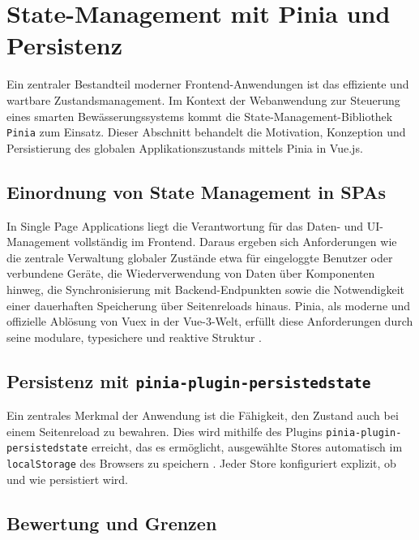 \section{State-Management mit Pinia und Persistenz}
\label{chap:pinia}

Ein zentraler Bestandteil moderner Frontend-Anwendungen ist das effiziente und wartbare Zustandsmanagement. Im Kontext der Webanwendung zur Steuerung eines smarten Bewässerungssystems kommt die State-Management-Bibliothek \texttt{Pinia} zum Einsatz. Dieser Abschnitt behandelt die Motivation, Konzeption und Persistierung des globalen Applikationszustands mittels Pinia in Vue.js.

\subsection{Einordnung von State Management in SPAs}

In Single Page Applications liegt die Verantwortung für das Daten- und UI-Management vollständig im Frontend. Daraus ergeben sich Anforderungen wie die zentrale Verwaltung globaler Zustände etwa für eingeloggte Benutzer oder verbundene Geräte, die Wiederverwendung von Daten über Komponenten hinweg, die Synchronisierung mit Backend-Endpunkten sowie die Notwendigkeit einer dauerhaften Speicherung über Seitenreloads hinaus. Pinia, als moderne und offizielle Ablösung von Vuex in der Vue-3-Welt, erfüllt diese Anforderungen durch seine modulare, typesichere und reaktive Struktur \citep{Vuex, Allotey2023}.



\subsection{Persistenz mit \texttt{pinia-plugin-persistedstate}}

Ein zentrales Merkmal der Anwendung ist die Fähigkeit, den Zustand auch bei einem Seitenreload zu bewahren. Dies wird mithilfe des Plugins \texttt{pinia-plugin-persistedstate} erreicht, das es ermöglicht, ausgewählte Stores automatisch im \texttt{localStorage} des Browsers zu speichern \citep{VueMastery2023}. Jeder Store konfiguriert explizit, ob und wie persistiert wird.



\subsection{Bewertung und Grenzen}

